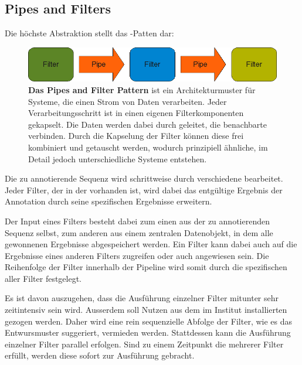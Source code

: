\subsection{Pipes and Filters}
Die höchste Abstraktion stellt das -Patten dar:

\begin{figure}[htbp]
	\begin{center}
		\includegraphics[scale=0.7]{pics/pipesFilter3.png}
	\caption[Pipes and Filter]{
	\textbf{Das Pipes and Filter Pattern}
	ist ein Architekturmuster für Systeme, die einen Strom von Daten verarbeiten.
	Jeder Verarbeitungsschritt ist in einen eigenen Filterkomponenten gekapselt.
	Die Daten werden dabei durch  geleitet, die benachbarte
	 verbinden.
	Durch die Kapselung der Filter können diese frei kombiniert und
	getauscht werden, wodurch prinzipiell ähnliche, im Detail jedoch
	unterschiedliche Systeme entstehen.
	\citep{buschmann_pattern-oriented_1996}}
	\end{center}
	\label{fig:pipesFilter}
\end{figure}

Die zu annotierende Sequenz wird schrittweise durch verschiedene 
bearbeitet. Jeder Filter, der in der  vorhanden ist, wird dabei
das entgültige Ergebnis der Annotation durch seine spezifischen Ergebnisse
erweitern.

Der Input eines Filters besteht dabei zum einen aus der zu
annotierenden Sequenz selbst, zum anderen aus einem zentralen Datenobjekt, in
dem alle gewonnenen Ergebnisse abgespeichert werden.
Ein Filter kann dabei auch auf die Ergebnisse eines anderen
Filters zugreifen oder auch angewiesen sein.
Die Reihenfolge der Filter innerhalb der Pipeline wird
somit durch die spezifischen  \citep{beck_patterns_1994}
aller Filter festgelegt.

Es ist davon auszugehen, dass die Ausführung einzelner Filter mitunter sehr
zeitintensiv sein wird. Ausserdem soll Nutzen aus dem im Institut installierten
  gezogen werden. Daher wird eine rein
sequenzielle Abfolge der Filter, wie es das Entwursmuster suggeriert, vermieden werden.
Stattdessen kann die Ausführung einzelner Filter parallel erfolgen.
Sind zu einem Zeitpunkt die  mehrerer Filter erfüllt,
werden diese sofort zur Ausführung gebracht.

